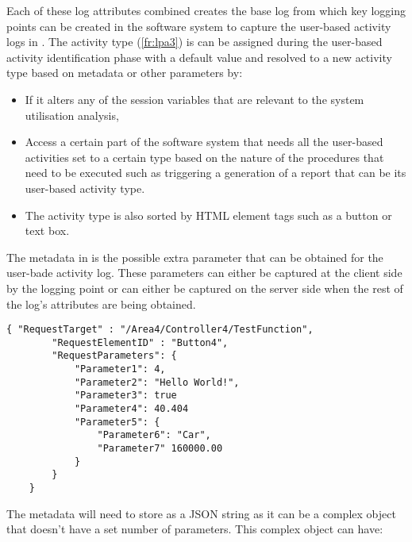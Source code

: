\clearpage

Each of these log attributes combined creates the base log from which key logging points can be created in the software system to capture the user-based activity logs in . The activity type (\ref{fr:lpa3}) is can be assigned during the user-based activity identification phase with a default value and resolved to a new activity type based on metadata or other parameters by:

\begin{itemize}
	\item If it alters any of the session variables that are relevant to the system utilisation analysis,
	\item Access a certain part of the software system that needs all the user-based activities set to a certain type based on the nature of the procedures that need to be executed such as triggering a generation of a report that can be its user-based activity type.
	\item The activity type is also sorted by HTML element tags such as a button or text box.
\end{itemize}

The metadata in  is the possible extra parameter that can be obtained for the user-bade activity log. These parameters can either be captured at the client side by the logging point or can either be captured on the server side when the rest of the log's attributes are being obtained.

\begin{lstlisting}[style=json, caption={\textit{Metadata JSON}}, label={fig:ch2_MetadataJsonExample}] 
	{ "RequestTarget" : "/Area4/Controller4/TestFunction",
		"RequestElementID" : "Button4",
		"RequestParameters": {
			"Parameter1": 4,
			"Parameter2": "Hello World!",
			"Parameter3": true
			"Parameter4": 40.404
			"Parameter5": {
				"Parameter6": "Car",
				"Parameter7" 160000.00
			}
		}		
	}
\end{lstlisting}

The metadata will need to store as a JSON string as it can be a complex object that doesn't have a set number of parameters. This complex object can have:

